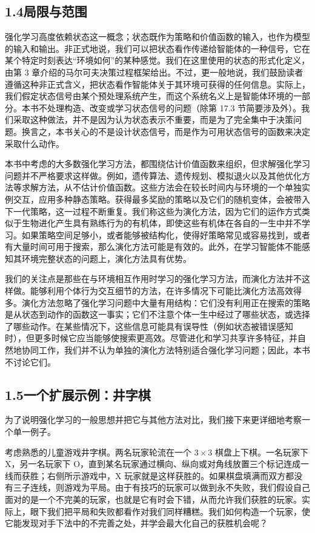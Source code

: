 \documentclass[UTF8, 12pt, fontset=fandol, oneside]{ctexart}
\begin{document}
\subsection*{1.4\quad 局限与范围}

强化学习高度依赖状态这一概念；状态既作为策略和价值函数的输入，也作为模型的输入和输出。非正式地说，我们可以把状态看作传递给智能体的一种信号，它在某个特定时刻表达“环境如何”的某种感觉。我们在这里使用的状态的形式化定义，由第 3 章介绍的马尔可夫决策过程框架给出。不过，更一般地说，我们鼓励读者遵循这种非正式含义，把状态看作智能体关于其环境可获得的任何信息。实际上，我们假定状态信号由某个预处理系统产生，而这个系统名义上是智能体环境的一部分。本书不处理构造、改变或学习状态信号的问题（除第 17.3 节简要涉及外）。我们采取这种做法，并不是因为认为状态表示不重要，而是为了完全集中于决策问题。换言之，本书关心的不是设计状态信号，而是作为可用状态信号的函数来决定采取什么动作。

本书中考虑的大多数强化学习方法，都围绕估计价值函数来组织，但求解强化学习问题并不严格要求这样做。例如，遗传算法、遗传规划、模拟退火以及其他优化方法等求解方法，从不估计价值函数。这些方法会在较长时间内与环境的一个单独实例交互，应用多种静态策略。获得最多奖励的策略以及它们的随机变体，会被带入下一代策略，这一过程不断重复。我们称这些为演化方法，因为它们的运作方式类似于生物进化产生具有熟练行为的有机体，即使这些有机体在各自的一生中并不学习。如果策略空间足够小，或者能够被结构化，使得好策略常见或容易找到，或者有大量时间可用于搜索，那么演化方法可能是有效的。此外，在学习智能体不能感知其环境完整状态的问题上，演化方法具有优势。

我们的关注点是那些在与环境相互作用时学习的强化学习方法，而演化方法并不这样做。能够利用个体行为交互细节的方法，在许多情况下可能比演化方法高效得多。演化方法忽略了强化学习问题中大量有用结构：它们没有利用正在搜索的策略是从状态到动作的函数这一事实；它们不注意个体一生中经过了哪些状态，或选择了哪些动作。在某些情况下，这些信息可能具有误导性（例如状态被错误感知时），但更多时候它应当能够使搜索更高效。尽管进化和学习共享许多特征，并自然地协同工作，我们并不认为单独的演化方法特别适合强化学习问题；因此，本书不讨论它们。

\subsection*{1.5\quad 一个扩展示例：井字棋}

为了说明强化学习的一般思想并把它与其他方法对比，我们接下来更详细地考察一个单一例子。

考虑熟悉的儿童游戏井字棋。两名玩家轮流在一个 $3\times3$ 棋盘上下棋。一名玩家下 X，另一名玩家下 O，直到某名玩家通过横向、纵向或对角线放置三个标记连成一线而获胜；右侧所示游戏中，X 玩家就是这样获胜的。如果棋盘填满而双方都没有三子连线，则游戏为平局。由于有技巧的玩家可以做到永不失败，我们假设自己面对的是一个不完美的玩家，也就是它有时会下错，从而允许我们获胜的玩家。实际上，眼下我们把平局和失败都看作对我们同样糟糕。我们如何构造一个玩家，使它能发现对手下法中的不完善之处，并学会最大化自己的获胜机会呢？
\end{document}
